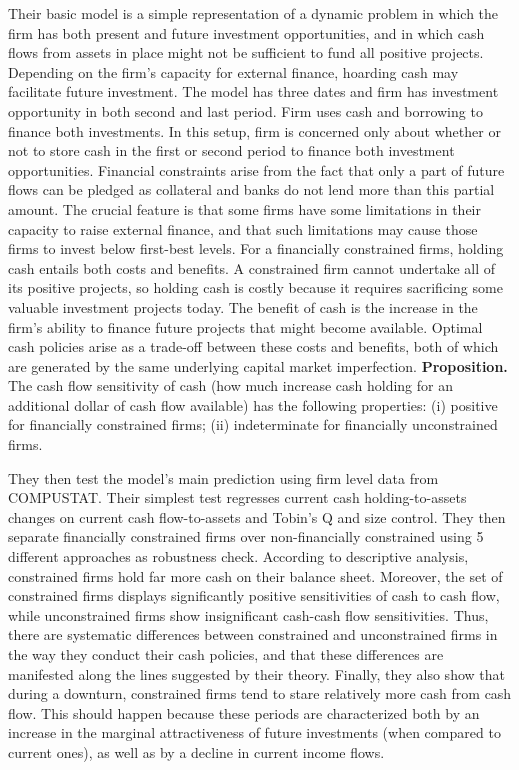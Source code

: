 \documentclass{article}
\begin{document}
{Their basic model is a simple representation of a dynamic problem in which the firm has both present and future investment opportunities, and in which cash flows from assets in place might not be sufficient to fund all positive projects. Depending on the firm's capacity for external finance, hoarding cash may facilitate future investment. The model has three dates and firm has investment opportunity in both second and last period. Firm uses cash and borrowing to finance both investments. In this setup, firm is concerned only about whether or not to store cash in the first or second period to finance both investment opportunities. Financial constraints arise from the fact that only a part of future flows can be pledged as collateral and banks do not lend more than this partial amount. The crucial feature is that some firms have some limitations in their capacity to raise external finance, and that such limitations may cause those firms to invest below first-best levels. For a financially constrained firms, holding cash entails both costs and benefits. A constrained firm cannot undertake all of its positive projects, so holding cash is costly because it requires sacrificing some valuable investment projects today. The benefit of cash is the increase in the firm's ability to finance future projects that might become available. Optimal cash policies arise as a trade-off between these costs and benefits, both of which are generated by the same underlying capital market imperfection. \textbf{Proposition.} The cash flow sensitivity of cash (how much increase cash holding for an additional dollar of cash flow available) has the following properties: (i) positive for financially constrained firms; (ii) indeterminate for financially unconstrained firms.

They then test the model's main prediction using firm level data from COMPUSTAT. Their simplest test regresses current cash holding-to-assets changes on current cash flow-to-assets and Tobin's Q and size control. They then separate financially constrained firms over non-financially constrained using 5 different approaches as robustness check. According to descriptive analysis, constrained firms hold far more cash on their balance sheet. Moreover, the set of constrained firms displays significantly positive sensitivities of cash to cash flow, while unconstrained firms show insignificant cash-cash flow sensitivities. Thus, there are systematic differences between constrained and unconstrained firms in the way they conduct their cash policies, and that these differences are manifested along the lines suggested by their theory. Finally, they also show that during a downturn, constrained firms tend to stare relatively more cash from cash flow. This should happen because these periods are characterized both by an increase in the marginal attractiveness of future investments (when compared to current ones), as well as by a decline in current income flows. 


}
\end{document}
